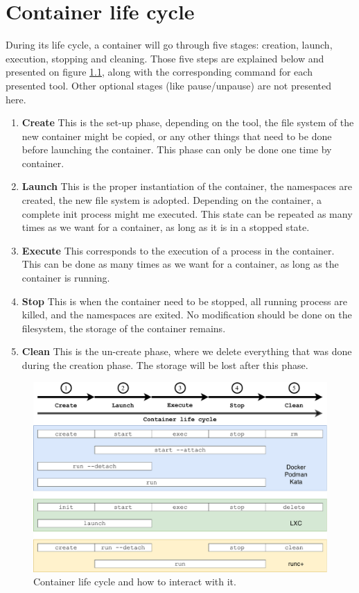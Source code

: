 \chapter{Container life cycle} \label{appendix:container-life-cycle}
During its life cycle, a container will go through five stages: creation, launch, execution, stopping and cleaning.  Those five steps are explained below and presented on figure \ref{fig:container-life-cycle}, along with the corresponding command for each presented tool.  Other optional stages (like pause/unpause) are not presented here.
\begin{enumerate}
\item\textbf{Create} This is the set-up phase, depending on the tool, the file system of the new container might be copied, or any other things that need to be done before launching the container.  This phase can only be done one time by container.
\item\textbf{Launch} This is the proper instantiation of the container, the namespaces are created, the new file system is adopted.  Depending on the container, a complete init process might me executed.  This state can be repeated as many times as we want for a container, as long as it is in a stopped state.
\item\textbf{Execute} This corresponds to the execution of a process in the container.  This can be done as many times as we want for a container, as long as the container is running.
\item\textbf{Stop} This is when the container need to be stopped, all running process are killed, and the namespaces are exited.  No modification should be done on the filesystem, the storage of the container remains.
\item\textbf{Clean} This is the un-create phase, where we delete everything that was done during the creation phase.  The storage will be lost after this phase.
\end{enumerate}
\begin{figure}[!h]
  \begin{center}
    \includegraphics[width=\linewidth]{images/Container-life-cycle.pdf}
    \caption{Container life cycle and how to interact with it.}
    \label{fig:container-life-cycle}
  \end{center}
\end{figure}

